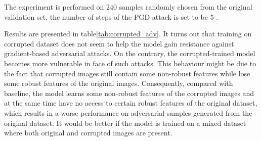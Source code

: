 \documentclass[../main.tex]{subfiles}
\begin{document}
The experiment is performed on 240 samples randomly chosen from the original validation set, the number of steps of the PGD attack is set to be 5 .

Results are presented in table\ref{tab:corrupted_adv}. It turns out that training on corrupted dataset does not seem to help the model gain resistance against gradient-based adversarial attacks. On the contrary,  the corrupted-trained model becomes more vulnerable in face of such attacks. This behaviour might be due to the fact that corrupted images still contain some non-robust features while lose some robust features of the original images. Consequently,  compared with baseline, the model learns some non-robust features of the corrupted images and at the same time have no access to certain robust features of the original dataset, which results in a worse performance on adversarial samples generated from the original dataset. It would be better if the model is trained on a mixed dataset where both original and corrupted images are present.
\end{document}
